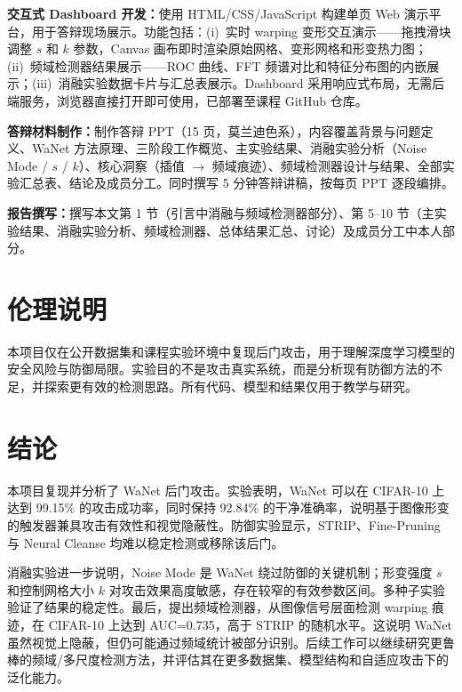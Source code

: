 \documentclass[UTF8,zihao=-4]{ctexart}
\begin{document}
\begin{itemize}
    \textbf{交互式 Dashboard 开发：}使用 HTML/CSS/JavaScript 构建单页 Web 演示平台，用于答辩现场展示。功能包括：(i)~实时 warping 变形交互演示——拖拽滑块调整 $s$ 和 $k$ 参数，Canvas 画布即时渲染原始网格、变形网格和形变热力图；(ii)~频域检测器结果展示——ROC 曲线、FFT 频谱对比和特征分布图的内嵌展示；(iii)~消融实验数据卡片与汇总表展示。Dashboard 采用响应式布局，无需后端服务，浏览器直接打开即可使用，已部署至课程 GitHub 仓库。

    \textbf{答辩材料制作：}制作答辩 PPT（15 页，莫兰迪色系），内容覆盖背景与问题定义、WaNet 方法原理、三阶段工作概览、主实验结果、消融实验分析（Noise Mode / $s$ / $k$）、核心洞察（插值 $\to$ 频域痕迹）、频域检测器设计与结果、全部实验汇总表、结论及成员分工。同时撰写 5 分钟答辩讲稿，按每页 PPT 逐段编排。

    \textbf{报告撰写：}撰写本文第 1 节（引言中消融与频域检测器部分）、第 5--10 节（主实验结果、消融实验分析、频域检测器、总体结果汇总、讨论）及成员分工中本人部分。
\end{itemize}

\section{伦理说明}

本项目仅在公开数据集和课程实验环境中复现后门攻击，用于理解深度学习模型的安全风险与防御局限。实验目的不是攻击真实系统，而是分析现有防御方法的不足，并探索更有效的检测思路。所有代码、模型和结果仅用于教学与研究。

\section{结论}

本项目复现并分析了 WaNet 后门攻击。实验表明，WaNet 可以在 CIFAR-10 上达到 99.15\% 的攻击成功率，同时保持 92.84\% 的干净准确率，说明基于图像形变的触发器兼具攻击有效性和视觉隐蔽性。防御实验显示，STRIP、Fine-Pruning 与 Neural Cleanse 均难以稳定检测或移除该后门。

消融实验进一步说明，Noise Mode 是 WaNet 绕过防御的关键机制；形变强度 $s$ 和控制网格大小 $k$ 对攻击效果高度敏感，存在较窄的有效参数区间。多种子实验验证了结果的稳定性。最后，提出频域检测器，从图像信号层面检测 warping 痕迹，在 CIFAR-10 上达到 AUC=0.735，高于 STRIP 的随机水平。这说明 WaNet 虽然视觉上隐蔽，但仍可能通过频域统计被部分识别。后续工作可以继续研究更鲁棒的频域/多尺度检测方法，并评估其在更多数据集、模型结构和自适应攻击下的泛化能力。
\end{document}
